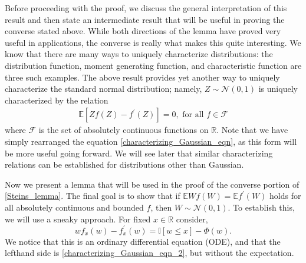 \documentclass[12pt]{article}
\newcommand{\R}{\mathbb{R}}
\newcommand{\indicator}[1]{\mathbb{I}[#1]}
\newcommand{\E}{\mathbb{E}}
\newcommand{\Gaussian}{\mathcal{N}}
\newcommand{\GaussianCDF}{\Phi}
\newcommand{\functionSpace}{\mathcal{F}}
\begin{document}
Before proceeding with the proof, we discuss the general interpretation of this result and then state an intermediate result that will be useful in proving the converse stated above. 
While both directions of the lemma have proved very useful in applications, the converse is really what makes this quite interesting. We know that there are many ways to uniquely 
characterize distributions: the distribution function, moment generating function, and characteristic function are three such examples. The above result provides yet another way to 
uniquely characterize the standard normal distribution; namely, $Z \sim \Gaussian(0, 1)$ is uniquely characterized by the relation 
\begin{align}
\E\left[Z f(Z) - f^\prime(Z)\right] = 0, \text{ for all } f \in \functionSpace \label{characterizing_Gaussian_eqn_2}
\end{align}
where $\functionSpace$ is the set of absolutely continuous functions on $\R$. Note that we have simply rearranged the equation \ref{characterizing_Gaussian_eqn}, as this 
form will be more useful going forward. 
We will see later that similar characterizing relations can be established for distributions other than 
Gaussian. 

Now we present a lemma that will be used in the proof of the converse portion of \ref{Steins_lemma}. The final goal is to show that if $\E W f(W) = \E f^\prime(W)$ holds for 
all absolutely continuous and bounded $f$, then $W \sim \Gaussian(0, 1)$. To establish this, we will use a sneaky approach. For fixed $x \in \R$ consider, 
\[
wf_x(w) - f_x^\prime(w) = \indicator{w \leq x} - \GaussianCDF(w).
\]
We notice that this is an ordinary differential equation (ODE), and that the lefthand side is \ref{characterizing_Gaussian_eqn_2}, but without the expectation.  
\end{document}
